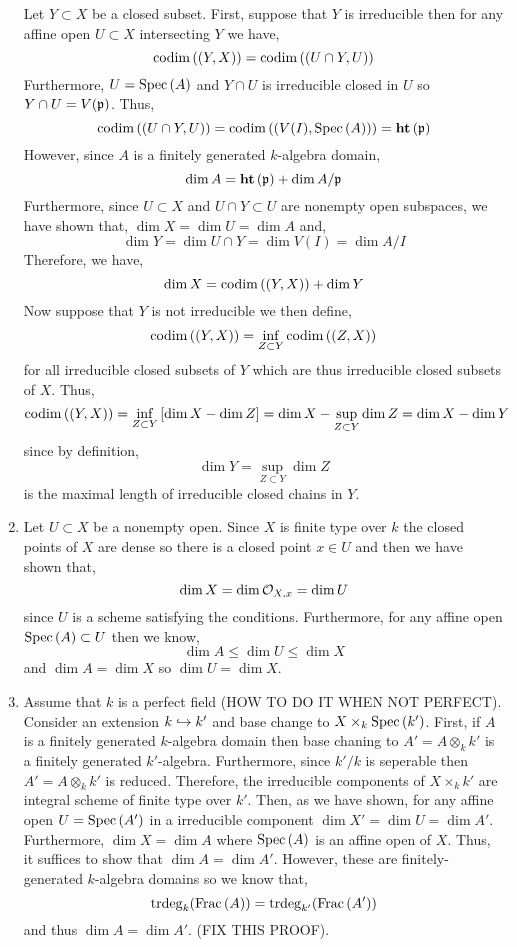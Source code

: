 \documentclass[12pt]{article}
\begin{document}
\begin{enumerate}
Let $Y \subset X$ be a closed subset. First, suppose that $Y$ is irreducible then for any affine open $U \subset X$ intersecting $Y$ we have,
\[ \mathrm{codim}\left( (Y, X) \right) = \mathrm{codim}\left( (U \cap Y, U) \right) \]
Furthermore, $U = \mathrm{Spec}\left( A \right)$ and $Y \cap U$ is irreducible closed in $U$ so $Y \cap U = V(\mathfrak{p})$. Thus,
\[ \mathrm{codim}\left( (U \cap Y, U) \right) = \mathrm{codim}\left( (V(I), \mathrm{Spec}\left( A \right)) \right) =\mathbf{ht}\left( \mathfrak{p} \right) \]
However, since $A$ is a finitely generated $k$-algebra domain,
\[ \dim{A} = \mathbf{ht}\left( \mathfrak{p} \right) + \dim{A / \mathfrak{p}} \]
Furthermore, since $U \subset X$ and  $U \cap Y \subset U$ are nonempty open subspaces, we have shown that, $\dim{X} = \dim{U} = \dim{A}$ and,
\[ \dim{Y} = \dim{U \cap Y} = \dim{V(I)} = \dim{A / I} \]
Therefore, we have,
\[ \dim{X} = \mathrm{codim}\left( (Y, X) \right) + \dim{Y} \]
Now suppose that $Y$ is not irreducible we then define,
\[ \mathrm{codim}\left( (Y, X) \right) = \inf_{Z \subset Y} \mathrm{codim}\left( (Z, X) \right) \]
for all irreducible closed subsets of $Y$ which are thus irreducible closed subsets of $X$. Thus,
\[ \mathrm{codim}\left( (Y, X) \right) = \inf_{Z \subset Y} \left[ \dim{X} -  \dim{Z} \right] = \dim{X} - \sup_{Z \subset Y} \dim{Z} = \dim{X} - \dim{Y} \]
since by definition,
\[ \dim{Y} = \sup_{Z \subset Y} \dim{Z} \]
is the maximal length of irreducible closed chains in $Y$. 

\item Let $U \subset X$ be a nonempty open. Since $X$ is finite type over $k$ the closed points of $X$ are dense so there is a closed point $x \in U$ and then we have shown that,
\[ \dim{X} = \dim{\mathcal{O}_{X, x}} = \dim{U} \]
since $U$ is a scheme satisfying the conditions. Furthermore, for any affine open $\mathrm{Spec}\left( A \right) \subset U$ then we know,
\[ \dim{A} \le \dim{U} \le \dim{X} \]
and $\dim{A} = \dim{X}$ so $\dim{U} = \dim{X}$.
  
\item Assume that $k$ is a perfect field (HOW TO DO IT WHEN NOT PERFECT). Consider an extension $k \hookrightarrow k'$ and base change to $X \times_k \mathrm{Spec}\left( k' \right)$. First, if $A$ is a finitely generated $k$-algebra domain then base chaning to $A' = A \otimes_k k'$ is a finitely generated $k'$-algebra. Furthermore, since $k' / k$ is seperable then $A' = A \otimes_k k'$ is reduced. Therefore, the irreducible components of $X \times_k k'$ are integral scheme of finite type over $k'$. Then, as we have shown, for any affine open $U = \mathrm{Spec}\left( A' \right)$ in a irreducible component $\dim{X'} = \dim{U} = \dim{A'}$. Furthermore, $\dim{X} = \dim{A}$ where $\mathrm{Spec}\left( A \right)$ is an affine open of $X$. Thus, it suffices to show that $\dim{A} = \dim{A'}$. However, these are finitely-generated $k$-algebra domains so we know that,
\[ \mathrm{trdeg}_{k}(\mathrm{Frac}\left(A\right)) = \mathrm{trdeg}_{k'}(\mathrm{Frac}\left(A'\right)) \]
and thus $\dim{A} = \dim{A'}$. (FIX THIS PROOF).
\end{enumerate}
\end{document}

